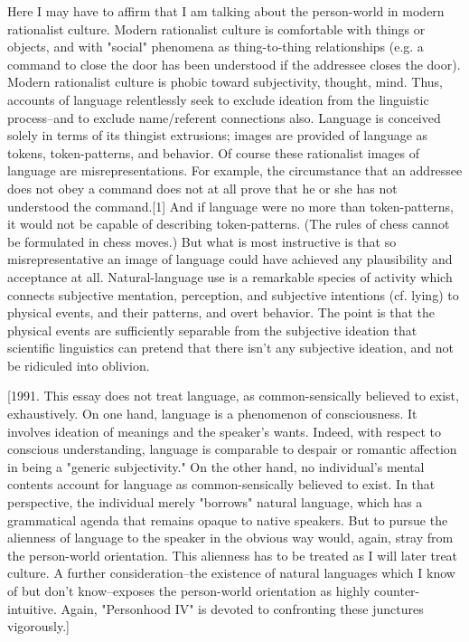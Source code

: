 Here I may have to affirm that I am talking about the person-world in modern rationalist culture. Modern rationalist culture is comfortable with things or objects, and with "social" phenomena as thing-to-thing relationships (e.g. a command to close the door has been understood if the addressee closes the door). Modern rationalist culture is phobic toward subjectivity, thought, mind. Thus, accounts of language relentlessly seek to exclude ideation from the linguistic process--and to exclude name/referent connections also. Language is conceived solely in terms of its thingist extrusions; images are provided of language as tokens, token-patterns, and behavior. Of course these rationalist images of language are misrepresentations. For example, the circumstance that an addressee does not obey a command does not at all prove that he or she has not understood the command.[1] And if language were no more than token-patterns, it would not be capable of describing token-patterns. (The rules of chess cannot be formulated in chess moves.) But what is most instructive is that so misrepresentative an image of language could have achieved any plausibility and acceptance at all. Natural-language use is a remarkable species of activity which connects subjective mentation, perception, and subjective intentions (cf. lying) to physical events, and their patterns, and overt behavior. The point is that the physical events are sufficiently separable from the subjective ideation that scientific linguistics can pretend that there isn't any subjective ideation, and not be ridiculed into oblivion.

[1991. This essay does not treat language, as common-sensically believed to exist, exhaustively. On one hand, language is a phenomenon of consciousness. It involves ideation of meanings and the speaker's wants. Indeed, with respect to conscious understanding, language is comparable to despair or romantic affection in being a "generic subjectivity." On the other hand, no individual's mental contents account for language as common-sensically believed to exist. In that perspective, the individual merely "borrows" natural language, which has a grammatical agenda that remains opaque to native speakers. But to pursue the alienness of language to the speaker in the obvious way would, again, stray from the person-world orientation. This alienness has to be treated as I will later treat culture. A further consideration--the existence of natural languages which I know of but don't know--exposes the person-world orientation as highly counter-intuitive. Again, "Personhood IV" is devoted to confronting these junctures vigorously.]

